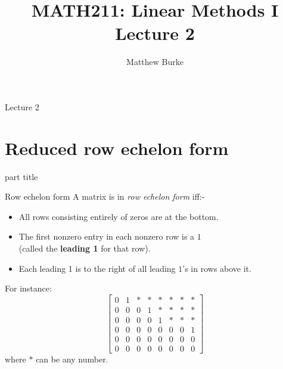 \documentclass{beamer}
\title{MATH211: Linear Methods I\\Lecture 2}
\author{Matthew Burke}
\date{\formatdate{11}{09}{2018}}
\begin{document}
\frame{\titlepage}

\begin{frame}{Lecture 2}
  \tableofcontents
\end{frame}

\section{Reduced row echelon form}
\label{sec:Reduced-row-echelon-form}

\begin{frame}
    \begin{beamercolorbox}[sep=12pt,center]{part title}
      \insertsection\par
    \end{beamercolorbox}
\end{frame}
\begin{frame}{Row echelon form}
  A matrix is in \emph{row echelon form} iff:-
  \begin{itemize}
  \item All rows consisting entirely of zeros are at the 
    bottom.
  \item The first nonzero entry in each nonzero row is a $1$
    \\(called the {\bf leading 1} for that row).
  \item Each leading 1 is to the right of all leading $1$'s 
    in rows above it.
  \end{itemize}
  For instance:
  \begin{equation*}
    \left[\begin{array}{rrrrrrrr}
            0 & 1 & * & * & * & * & * & * \\
            0 & 0 & 0 & 1 & * & * & * & * \\
            0 & 0 & 0 & 0 & 1 & * & * & * \\
            0 & 0 & 0 & 0 & 0 & 0 & 0 & 1 \\
            0 & 0 & 0 & 0 & 0 & 0 & 0 & 0 \\
            0 & 0 & 0 & 0 & 0 & 0 & 0 & 0 
          \end{array}\right]
      \end{equation*}
      where $*$ can be any number.
\end{frame}
\end{document}
